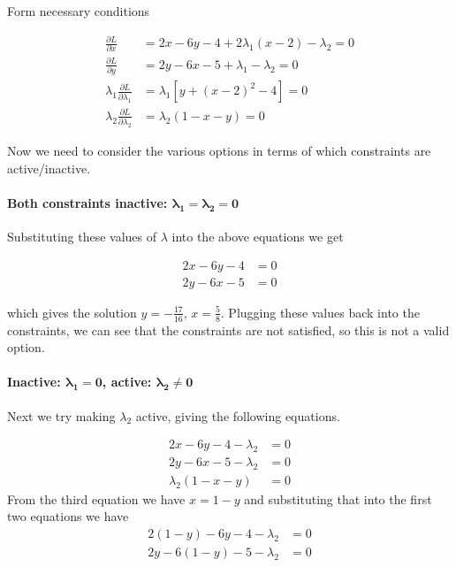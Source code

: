 \documentclass[11pt,letterpaper,onecolumn,notitlepage]{article}
\begin{document}
Form necessary conditions

\begin{align*}
  \frac{\partial L}{\partial x}&=2x-6y-4+2\lambda_{1}(x-2)-\lambda_{2}=0 \\
  \frac{\partial L}{\partial y}&=2y-6x-5+\lambda_{1}-\lambda_{2}=0 \\
  \lambda_{1}\frac{\partial L}{\partial\lambda_{1}}&=\lambda_{1}\left[y+(x-2)^{2}-4\right]=0 \\
  \lambda_{2}\frac{\partial L}{\partial\lambda_{2}}&=\lambda_{2}(1-x-y)=0
\end{align*}

Now we need to consider the various options in terms of which constraints are active/inactive.

\paragraph{Both constraints inactive: $\boldsymbol{\lambda_{1}=\lambda_{2}=0}$}

Substituting these values of $\lambda$ into the above equations we get

\begin{align*}
  2x-6y-4&=0 \\
  2y-6x-5&=0
\end{align*}

which gives the solution $y=-\frac{17}{16}$, $x=\frac{5}{8}$.
Plugging these values back into the constraints, we can see that the constraints are not satisfied, so this is not a valid option.

\paragraph{Inactive: $\boldsymbol{\lambda_{1}=0}$, active: $\boldsymbol{\lambda_{2}\neq0}$}

Next we try making $\lambda_{2}$ active, giving the following equations.

\begin{align*}
2x-6y-4-\lambda_{2}&=0 \\
2y-6x-5-\lambda_{2}&=0 \\
\lambda_{2}(1-x-y)&=0
\end{align*}
From the third equation we have $x=1-y$ and substituting that into the first two equations we have
\begin{align*}
2(1-y)-6y-4-\lambda_{2}&=0 \\
2y-6(1-y)-5-\lambda_{2}&=0 \\
\end{align*}
\end{document}
